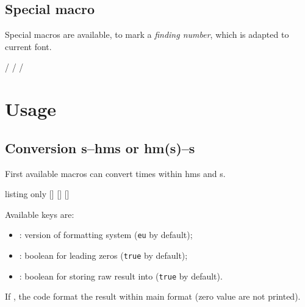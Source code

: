 \documentclass[11pt,a4paper]{ltxdoc}
\begin{document}
\subsection{Special macro}

Special macros are available, to mark a \textit{finding number}, which is adapted to current font.

\begin{DemoCode}{}
 /  /  / 
\end{DemoCode}

\section{Usage}

\subsection{Conversion s--hms or hm(s)--s}

First available macros can convert times within hms and s.

\begin{DemoCode}{listing only}
[\macro]
[\macro]
[\macro]
\end{DemoCode}

Available keys are:

\begin{itemize}[leftmargin=*]
	\item {} : version of formatting system (\texttt{eu} by default);
	\item {} : boolean for leading zeros (\texttt{true} by default);
	\item {} : boolean for storing raw result into \ShowCode{[\\macro]} (\texttt{true} by default).
\end{itemize}

If \ShowCode{[raw=false]}, the code format the result within  main format (zero value are not printed).

\begin{DemoCode}{}
\convtosec\\
\convtosec\\
\convtohms
\end{DemoCode}

\begin{DemoCode}{}
\\
\\
\\
\\
\\
\end{DemoCode}
\end{document}
